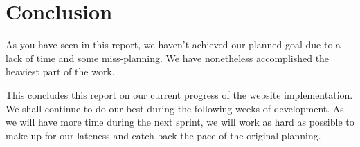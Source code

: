 \section{Conclusion}

As you have seen in this report, we haven't achieved our planned goal due to a lack of time and some miss-planning. We have nonetheless accomplished the heaviest part of the work. \newline

This concludes this report on our current progress of the website implementation. We shall continue to do our best during the following weeks of development.
As we will have more time during the next sprint, we will work as hard as possible to make up for our lateness and catch back the pace of the original planning.